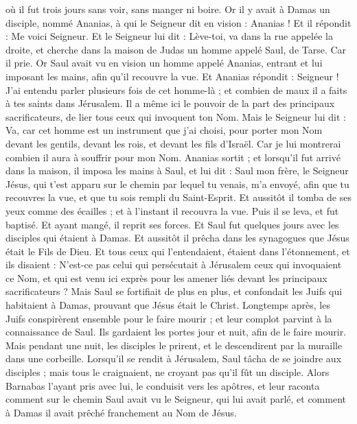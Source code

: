 \begin{multicols}{2}
où il fut trois jours sans voir, sans manger ni boire.
Or il y avait à Damas un disciple, nommé Ananias, à qui le Seigneur dit en vision : Ananias ! Et il répondit : Me voici Seigneur.
Et le Seigneur lui dit : Lève-toi, va dans la rue appelée la droite, et cherche dans la maison de Judas un homme appelé Saul, de Tarse.
Car il prie. Or Saul avait vu en vision un homme appelé Ananias, entrant et lui imposant les mains, afin qu'il recouvre la vue.
Et Ananias répondit : Seigneur ! J'ai entendu parler plusieurs fois de cet homme-là ; et combien de maux il a faits à tes saints dans Jérusalem.
Il a même ici le pouvoir de la part des principaux sacrificateurs, de lier tous ceux qui invoquent ton Nom.
Mais le Seigneur lui dit : Va, car cet homme est un instrument que j'ai choisi, pour porter mon Nom devant les gentils, devant les rois, et devant les fils d'Israël.
Car je lui montrerai combien il aura à souffrir pour mon Nom.
Ananias sortit ; et lorsqu’il fut arrivé dans la maison, il imposa les mains à Saul, et lui dit : Saul mon frère, le Seigneur Jésus, qui t'est apparu sur le chemin par lequel tu venais, m'a envoyé, afin que tu recouvres la vue, et que tu sois rempli du Saint-Esprit.
Et aussitôt il tomba de ses yeux comme des écailles ; et à l'instant il recouvra la vue. Puis il se leva, et fut baptisé.
Et ayant mangé, il reprit ses forces. Et Saul fut quelques jours avec les disciples qui étaient à Damas.
Et aussitôt il prêcha dans les synagogues que Jésus était le Fils de Dieu.
Et tous ceux qui l'entendaient, étaient dans l’étonnement, et ils disaient : N'est-ce pas celui qui persécutait à Jérusalem ceux qui invoquaient ce Nom, et qui est venu ici exprès pour les amener liés devant les principaux sacrificateurs ?
Mais Saul se fortifiait de plus en plus, et confondait les Juifs qui habitaient à Damas, prouvant que Jésus était le Christ.
Longtemps après, les Juifs conspirèrent ensemble pour le faire mourir ;
et leur complot parvint à la connaissance de Saul. Ils gardaient les portes jour et nuit, afin de le faire mourir.
Mais pendant une nuit, les disciples le prirent, et le descendirent par la muraille dans une corbeille.
Lorsqu’il se rendit à Jérusalem, Saul tâcha de se joindre aux disciples ; mais tous le craignaient, ne croyant pas qu'il fût un disciple.
Alors Barnabas l’ayant pris avec lui, le conduisit vers les apôtres, et leur raconta comment sur le chemin Saul avait vu le Seigneur, qui lui avait parlé, et comment à Damas il avait prêché franchement au Nom de Jésus.

\end{multicols}

